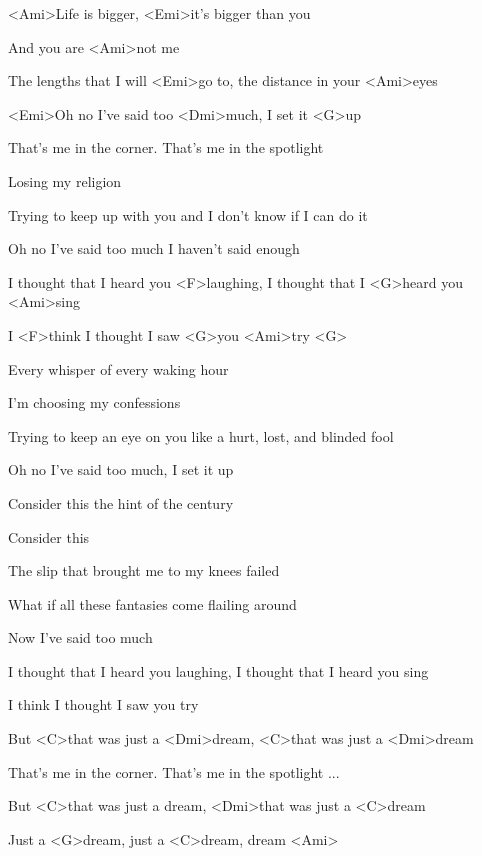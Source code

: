 

\zs
<Ami>Life is bigger,
<Emi>it's bigger than you

And you are <Ami>not me

The lengths that I will <Emi>go to,
the distance in your <Ami>eyes

<Emi>Oh no I've said too <Dmi>much,
I set it <G>up
\ks

\zs
That's me in the corner.
That's me in the spotlight

Losing my religion

Trying to keep up with you
and I don't know if I can do it

Oh no I've said too much
I haven't said enough
\ks

\zr
I thought that I heard you <F>laughing,
I thought that I <G>heard you <Ami>sing

I <F>think I thought I saw <G>you <Ami>try <G>
\kr

\zs
Every whisper
of every waking hour

I'm choosing my confessions

Trying to keep an eye on you
like a hurt, lost, and blinded fool

Oh no I've said too much,
I set it up
\ks

\zs
Consider this
the hint of the century

Consider this

The slip that brought me
to my knees failed

What if all these fantasies
come flailing around

Now I've said too much
\ks

\zr
I thought that I heard you laughing,
I thought that I heard you sing

I think I thought I saw you try
\kr

\zr
But <C>that was just a <Dmi>dream,
<C>that was just a <Dmi>dream
\kr

\zs
That's me in the corner.
That's me in the spotlight ...
\ks

\zr
But <C>that was just a dream,
<Dmi>that was just a <C>dream

Just a <G>dream, just a <C>dream, dream <Ami>
\kr

\kp






















